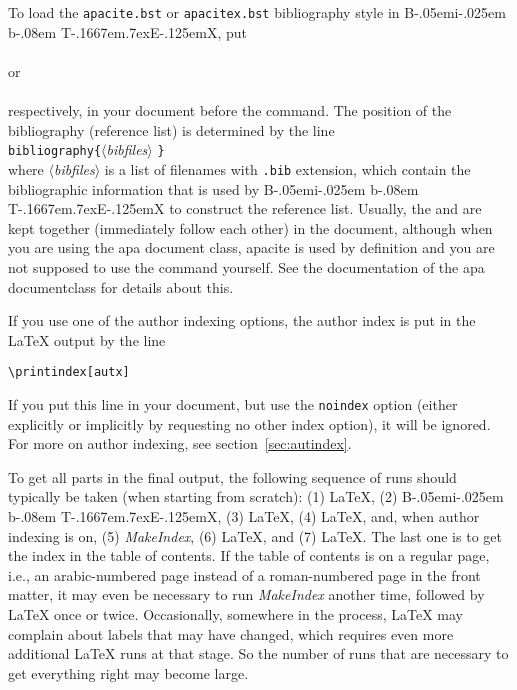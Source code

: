 \documentclass{article}
\makeatletter
\def\BibTeX{{\rm B\kern-.05em{\sc i\kern-.025em b}\kern-.08em
    T\kern-.1667em\lower.7ex\hbox{E}\kern-.125emX}}%
\newcommand{\MakeIndex}{\textit{MakeIndex}}
\newcommand{\pkg}[1]{\textsf{#1}}%
\newcommand{\fname}[1]{\texttt{#1}}%
\newcommand{\pkgoption}[1]{\texttt{#1}}%
\newcommand{\cmd}[1]{\texttt{\string#1}}%
\newcommand{\bs}{{\ttfamily \@backslashchar}}%
\newcommand{\opt}[1]{$\langle${\itshape #1}$\rangle$}%
\newcommand{\cmdtwo}[2]{{\mdseries\bs\texttt{#1\{}\opt{#2}%
                        \texttt{\}}}}%
\makeatother
\begin{document}
%
To load the \fname{apacite.bst} or \fname{apacitex.bst} bibliography style in
\BibTeX{}, put
\mbox{}\vspace{0.7\baselineskip}\\
\verb++
\mbox{}\vspace{0.7\baselineskip}\\
or
\mbox{}\vspace{0.7\baselineskip}\\
\verb++
\mbox{}\vspace{0.7\baselineskip}\\
respectively, in your document before the \cmd{} command. The
position of the bibliography (reference list) is determined by the line
\mbox{}\vspace{0.7\baselineskip}\\
\cmdtwo{bibliography}{bibfiles}
\mbox{}\vspace{0.7\baselineskip}\\
where \opt{bibfiles} is a list of filenames with \fname{.bib} extension, which
contain the bibliographic information that is used by \BibTeX{} to construct
the reference list. Usually, the \cmd{} and
\cmd{} are kept together (immediately follow each other) in the
document, although when you are using the \pkg{apa} document class,
\pkg{apacite} is used by definition and you are not supposed to use the
\cmd{} command yourself. See the documentation of the
\pkg{apa} documentclass for details about this.

If you use one of the author indexing options, the author index is put in
the \LaTeX{} output by the line
\begin{verbatim}
\printindex[autx]
\end{verbatim}
If you put this line in your document, but use the \pkgoption{noindex} option
(either explicitly or implicitly by requesting no other index option), it will
be ignored. For more on author indexing, see section~\ref{sec:autindex}.

To get all parts in the final output, the following sequence of runs should
typically be taken (when starting from scratch): (1) \LaTeX{}, (2) \BibTeX{},
(3) \LaTeX{}, (4) \LaTeX{}, and, when author indexing is on, (5) \MakeIndex{},
(6) \LaTeX{}, and (7) \LaTeX{}. The last one is to get the index in the table
of contents. If the table of contents is on a regular page, i.e., an
arabic-numbered page instead of a roman-numbered page in the front matter, it
may even be necessary to run \MakeIndex{} another time, followed by \LaTeX{}
once or twice. Occasionally, somewhere in the process, \LaTeX{} may complain
about labels that may have changed, which requires even more additional
\LaTeX{} runs at that stage. So the number of runs that are necessary to get
everything right may become large.
\end{document}

